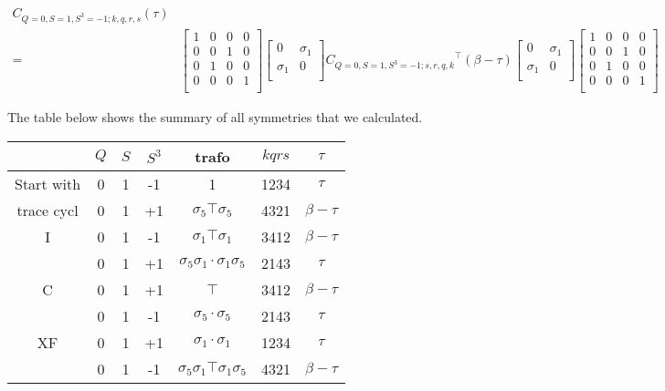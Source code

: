 \begin{equation*}
  \begin{aligned}
    C_{Q=0,S=1,S^3=-1;k,q,r,s} (\tau) \\
    =& \left[ {\begin{array}{cccc}
      1 & 0 & 0 & 0 \\
      0 & 0 & 1 & 0 \\
      0 & 1 & 0 & 0 \\
      0 & 0 & 0 & 1 \\
    \end{array} } \right]
    \left[ {\begin{array}{cc}
      0 & \sigma_1 \\
      \sigma_1 & 0 \\
    \end{array} } \right]
    {C_{Q=0,S=1,S^3=-1;s,r,q,k}}^\top (\beta-\tau)
    \left[ {\begin{array}{cc}
      0 & \sigma_1 \\
      \sigma_1 & 0 \\
    \end{array} } \right]
    \left[ {\begin{array}{cccc}
      1 & 0 & 0 & 0 \\
      0 & 0 & 1 & 0 \\
      0 & 1 & 0 & 0 \\
      0 & 0 & 0 & 1 \\
    \end{array} } \right]
  \end{aligned}
\end{equation*}

The table below shows the summary of all symmetries that we calculated.

\begin{table}[h]
  \centering
  \begin{tabular}{c|cccccc}
             & $Q$ & $S$ & $S^3$ & trafo & $kqrs$    & $\tau$  \\
  \hline
  Start with & 0 & 1 & -1 & 1 & 1234 &  $\tau$  \\
  \hline
  trace cycl & 0 & 1 & +1 & $\sigma_5 \top \sigma_5$ & 4321 & $\beta-\tau$ \\
  \hline
  I          & 0 & 1 & -1 & $\sigma_1 \top \sigma_1$ & 3412 & $\beta-\tau$ \\
             & 0 & 1 & +1 & $\sigma_5\sigma_1\cdot\sigma_1\sigma_5$ & 2143 & $\tau$ \\
  \hline\hline
  C          & 0 & 1 & +1 & $\top$ & 3412 & $\beta-\tau$ \\
             & 0 & 1 & -1 & $\sigma_5\cdot\sigma_5$ & 2143 & $\tau$ \\
  \hline
  XF         & 0 & 1 & +1 & $\sigma_1\cdot\sigma_1$ & 1234 & $\tau$ \\
             & 0 & 1 & -1 & $\sigma_5\sigma_1\top\sigma_1\sigma_5$ & 4321 & $\beta-\tau$
  \end{tabular}
\end{table}

